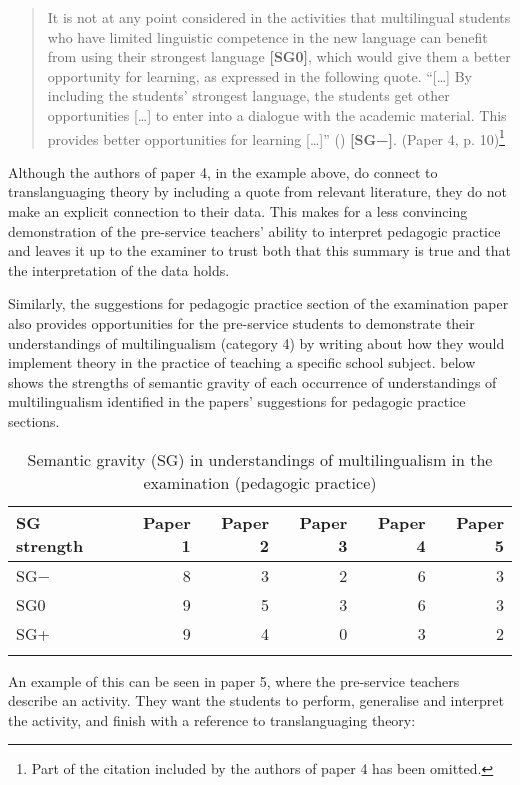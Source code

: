 \documentclass[output=paper]{langscibook}
\begin{document}
\begin{quote}
It is not at any point considered in the activities that multilingual students who have limited linguistic competence in the new language can benefit from using their strongest language \textbf{[SG0]}, which would give them a better opportunity for learning, as expressed in the following quote. “[…] By including the students' strongest language, the students get other opportunities […] to enter into a dialogue with the academic material. This provides better opportunities for learning […]” (\citealt[95]{HolmenThise2020}) \textbf{[SG−]}. (Paper 4, p. 10)\footnote{Part of the citation included by the authors of paper 4 has been omitted.}
\end{quote}

Although the authors of paper 4, in the example above, do connect to translanguaging theory by including a quote from relevant literature, they do not make an explicit connection to their data. This makes for a less convincing demonstration of the pre-service teachers’ ability to interpret pedagogic practice and leaves it up to the examiner to trust both that this summary is true and that the interpretation of the data holds.

Similarly, the suggestions for pedagogic practice section of the examination paper also provides opportunities for the pre-service students to demonstrate their understandings of multilingualism (category 4) by writing about how they would implement theory in the practice of teaching a specific school subject.  below shows the strengths of semantic gravity of each occurrence of understandings of multilingualism identified in the papers’ suggestions for pedagogic practice sections.


\begin{table}
\begin{tabular}{l *5{r}}
\lsptoprule
SG strength & Paper 1 & Paper 2  & Paper 3 & Paper 4 & Paper 5\\\midrule
SG− & 8 & 3 & 2 & 6 & 3\\
SG0 & 9 & 5 & 3 & 6 & 3\\
SG+ & 9 & 4 & 0 & 3 & 2\\
\lspbottomrule
\end{tabular}
\caption{Semantic gravity (SG) in understandings of multilingualism in the examination (pedagogic practice)} 
\label{tab:ostergaard:3}
\end{table}

An example of this can be seen in paper 5, where the pre-service teachers describe an activity.  They want the students to perform, generalise and interpret the activity, and finish with a reference to translanguaging theory:
\end{document}
